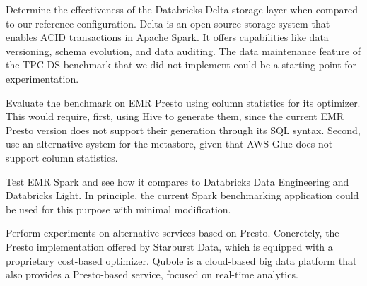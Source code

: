 Determine the effectiveness of the Databricks Delta storage layer when compared to our reference configuration. Delta is an open-source storage system that enables ACID transactions in Apache Spark. It offers capabilities like data versioning, schema evolution, and data auditing. The data maintenance feature of the TPC-DS benchmark that we did not implement could be a starting point for experimentation.

Evaluate the benchmark on EMR Presto using column statistics for its optimizer. This would require, first, using Hive to generate them, since the current EMR Presto version does not support their generation through its SQL syntax. Second, use an alternative system for the metastore, given that AWS Glue does not support column statistics.

Test EMR Spark and see how it compares to Databricks Data Engineering and Databricks Light. In principle, the current Spark benchmarking application could be used for this purpose with minimal modification.

Perform experiments on alternative services based on Presto. Concretely, the Presto implementation offered by Starburst Data, which is equipped with a proprietary cost-based optimizer. Qubole is a cloud-based big data platform that also provides a Presto-based service, focused on real-time analytics.
